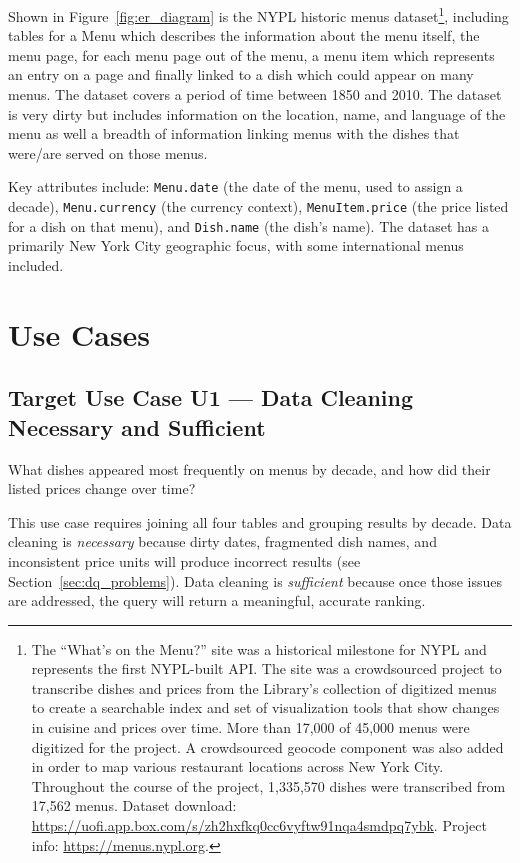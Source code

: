 \documentclass[11pt]{article}
\begin{document}
Shown in Figure~\ref{fig:er_diagram} is the NYPL historic menus dataset\footnote{The
``What's on the Menu?'' site was a historical milestone for NYPL and represents the
first NYPL-built API. The site was a crowdsourced project to transcribe dishes and
prices from the Library's collection of digitized menus to create a searchable index
and set of visualization tools that show changes in cuisine and prices over time.
More than 17,000 of 45,000 menus were digitized for the project. A crowdsourced
geocode component was also added in order to map various restaurant locations across
New York City. Throughout the course of the project, 1,335,570 dishes were
transcribed from 17,562 menus. Dataset download:
\url{https://uofi.app.box.com/s/zh2hxfkq0cc6vyftw91nqa4smdpq7ybk}.
Project info: \url{https://menus.nypl.org}.}, including tables for a Menu which
describes the information about the menu itself, the menu page, for each menu page
out of the menu, a menu item which represents an entry on a page and finally linked
to a dish which could appear on many menus. The dataset covers a period of time
between 1850 and 2010. The dataset is very dirty but includes information on the
location, name, and language of the menu as well a breadth of information linking
menus with the dishes that were/are served on those menus.

Key attributes include:
\texttt{Menu.date} (the date of the menu, used to assign a decade),
\texttt{Menu.currency} (the currency context),
\texttt{MenuItem.price} (the price listed for a dish on that menu),
and \texttt{Dish.name} (the dish's name). The dataset has a
primarily New York City geographic focus, with some international menus included.

\section{Use Cases}  %
\label{sec:use_cases}

\subsection{Target Use Case U1 --- Data Cleaning Necessary and Sufficient}  %
\label{sec:u1}

What dishes appeared most frequently on menus by decade, and how did their listed prices change over time?

This use case requires joining all four tables and grouping results by decade.
Data cleaning is \emph{necessary} because dirty dates, fragmented dish names, and
inconsistent price units will produce incorrect results (see Section~\ref{sec:dq_problems}).
Data cleaning is \emph{sufficient} because once those issues are addressed, the
query will return a meaningful, accurate ranking.
\end{document}
